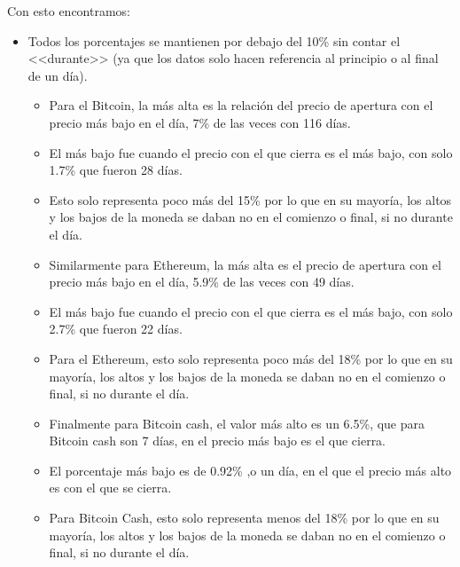 \documentclass[12pt,letterpaper]{article}
\begin{document}
    Con esto encontramos:

    \begin{itemize}

        \item  Todos los porcentajes se mantienen por debajo del 10\% sin contar el <<durante>> (ya que los datos solo hacen referencia al principio o al final de un d\'ia).

        \begin{itemize}

            \item Para el Bitcoin, la más alta es la relaci\'on del precio de apertura con el precio más bajo en el día, 7\% de las veces con 116 días.
            
            \item El más bajo fue cuando el precio con el que cierra es el más bajo, con solo 1.7\% que fueron 28 días.

            \item Esto solo representa poco más del 15\% por lo que en su mayoría, los altos y los bajos de la moneda se daban no en el comienzo o final, si no durante el día.

        \end{itemize}

        \begin{itemize}

            \item Similarmente para Ethereum, la más alta es el precio de apertura con el precio más bajo en el día, 5.9\% de las veces con 49 días.
            
            \item El más bajo fue cuando el precio con el que cierra es el más bajo, con solo 2.7\% que fueron 22 días.

            \item Para el Ethereum, esto solo representa poco más del 18\% por lo que en su mayoría, los altos y los bajos de la moneda se daban no en el comienzo o final, si no durante el día.

        \end{itemize}

        \begin{itemize}

            \item Finalmente para Bitcoin cash, el valor más alto es un 6.5\%, que para Bitcoin cash son 7 días, en el precio más bajo es el que cierra.

            \item El porcentaje más bajo es de 0.92\% ,o un día, en el que el precio más alto es con el que se cierra.
    
            \item Para Bitcoin Cash, esto solo representa menos del 18\% por lo que en su mayoría, los altos y los bajos de la moneda se daban no en el comienzo o final, si no durante el día.
        \end{itemize}

    \end{itemize}
\end{document}
